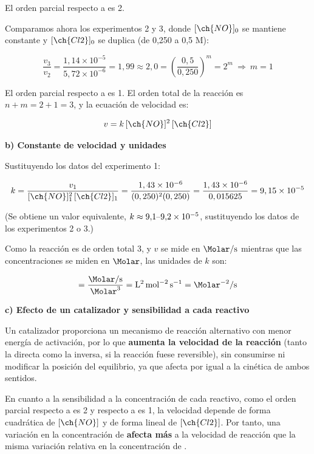 \begin{exerciseEVAU}
\begin{solu}
    El orden parcial respecto a  es 2.

    Comparamos ahora los experimentos 2 y 3, donde \([\ch{NO}]_0\) se mantiene constante y \([\ch{Cl2}]_0\) se duplica (de 0,250 a 0,5 M):

    \begin{equation*}
        \dfrac{v_3}{v_2} = \dfrac{1,14 \times 10^{-5}}{5,72 \times 10^{-6}} = 1,99 \approx 2,0 = \left( \dfrac{0,5}{0,250} \right)^m = 2^m \ \Rightarrow \ m = 1
    \end{equation*}

    El orden parcial respecto a  es 1. El orden total de la reacción es \(n + m = 2 + 1 = 3\), y la ecuación de velocidad es:

    \begin{equation*}
        v = k\, [\ch{NO}]^2\, [\ch{Cl2}]
    \end{equation*}

    \textbf{b) Constante de velocidad y unidades}

    Sustituyendo los datos del experimento 1:

    \begin{equation*}
        k = \dfrac{v_1}{[\ch{NO}]_1^2\, [\ch{Cl2}]_1} = \dfrac{1,43 \times 10^{-6}}{(0,250)^2 (0,250)} = \dfrac{1,43 \times 10^{-6}}{0,015625} = 9,15 \times 10^{-5}
    \end{equation*}

    (Se obtiene un valor equivalente, \(k \approx 9{,}1$–$9{,}2 \times 10^{-5}\), sustituyendo los datos de los experimentos 2 o 3.)

    Como la reacción es de orden total 3, y \(v\) se mide en \(\unit{\Molar\per\s}\) mientras que las concentraciones se miden en \(\unit{\Molar}\), las unidades de \(k\) son:

    \begin{equation*}
        [k] = \dfrac{\unit{\Molar\per\s}}{\unit{\Molar^3}} = \si{\square\litre\per\square\mole\per\s} = \si{\Molar^{-2}\per\s}
    \end{equation*}

    \textbf{c) Efecto de un catalizador y sensibilidad a cada reactivo}

    Un catalizador proporciona un mecanismo de reacción alternativo con menor energía de activación, por lo que \textbf{aumenta la velocidad de la reacción} (tanto la directa como la inversa, si la reacción fuese reversible), sin consumirse ni modificar la posición del equilibrio, ya que afecta por igual a la cinética de ambos sentidos.

    En cuanto a la sensibilidad a la concentración de cada reactivo, como el orden parcial respecto a  es 2 y respecto a  es 1, la velocidad depende de forma cuadrática de \([\ch{NO}]\) y de forma lineal de \([\ch{Cl2}]\). Por tanto, una variación en la concentración de  \textbf{afecta más} a la velocidad de reacción que la misma variación relativa en la concentración de .

\end{solu}
\end{exerciseEVAU}

